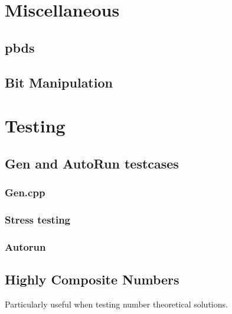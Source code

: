 \section{Miscellaneous}
\subsection{pbds}
\subsection{Bit Manipulation}

\section{Testing}
\subsection{Gen and AutoRun testcases}
\subsubsection{Gen.cpp}
\subsubsection{Stress testing}
%
\subsubsection{Autorun}
%
\subsection{Highly Composite Numbers}
Particularly useful when testing number theoretical solutions.
%




